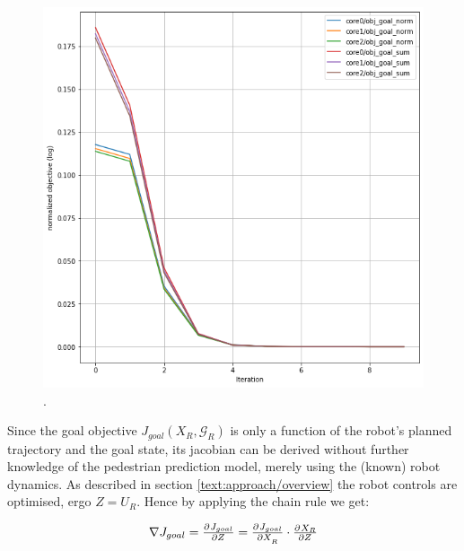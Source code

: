 \begin{figure}[!ht]
\begin{center}
\includegraphics[width=\imgwidth]{images/goal_norm_vs_sum.png}
.
\label{img:goal_norm_vs_sum}
\end{center}
\end{figure}

Since the goal objective $J_{goal}(X_R, \mathcal{G}_R)$ is only a function of the robot's planned trajectory and the goal state, its jacobian can be derived without further knowledge of the pedestrian prediction model, merely using the (known) robot dynamics. As described in section \ref{text:approach/overview} the robot controls are optimised, ergo $Z = U_R$. Hence by applying the chain rule we get: 

\begin{equation}
\nabla J_{goal} = \pd{J_{goal}}{Z} = \pd{J_{goal}}{X_R} \cdot \pd{X_R}{Z}
\end{equation}


